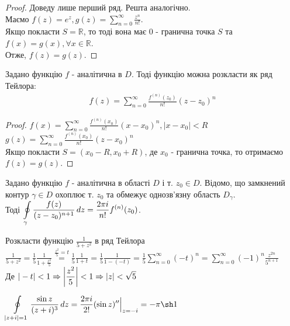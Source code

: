 \documentclass{math_library}
\begin{document}
\begin{proof}
Доведу лише перший ряд. Решта аналогічно.\\
Маємо $f(z) = e^z, g(z)=\displaystyle \sum_{n=0}^{\infty} \frac{z^n}{n!}$.\\
Якщо покласти $S=\mathbb{R}$, то тоді вона має $0$ - гранична точка $S$ та $f(x)=g(x), \forall x \in \mathbb{R}$.\\
	Отже, $f(z)=g(z)$.
\end{proof}

\begin{corollary}
Задано функцію $f$ - аналітична в $D$. Тоді функцію можна розкласти як ряд Тейлора:
\begin{align*}
	f(z) = \sum_{n=0}^{\infty} \frac{f^{(n)}(z_0)}{n!} (z-z_0)^n
\end{align*}
\end{corollary}

\begin{proof}
$f(x)=\displaystyle \sum_{n=0}^{\infty} \frac{f^{(n)}(x_0)}{n!} (x-x_0)^n, |x-x_0|<R$\\ $\displaystyle g(z)=\sum_{n=0}^{\infty} \frac{f^{(n)}(x_0)}{n!} (z-x_0)^n$\\
	Якщо покласти $S=(x_0-R, x_0+R)$, де $x_0$ - гранична точка, то отримаємо $f(z)=g(z)$. 
\end{proof}

\begin{corollary}
Задано функцію $f$ - аналітична в області $D$ і т. $z_0 \in D$. Відомо, що замкнений контур $\gamma \in D$ охоплює т. $z_0$ та обмежує однозв'язну область $D_{\gamma}$. \\
Тоді $\displaystyle\oint\displaylimits_{\gamma} \frac{f(z)}{(z-z_0)^{n+1}}\,dz = \frac{2 \pi i}{n!} f^{(n)}(z_0)$.
\end{corollary}

\begin{example}
Розкласти функцію $\displaystyle \frac{1}{5+z^2}$ в ряд Тейлора\\
	$\displaystyle \frac{1}{5+z^2} = \frac{1}{5} \frac{1}{1 + \frac{z^2}{5}} \overset{\textstyle \frac{z^2}{5} = t}{=} \frac{1}{5} \frac{1}{1+t} = \frac{1}{5} \frac{1}{1-(-t)} = \frac{1}{5} \sum_{n=0}^{\infty} (-t)^n = \sum_{n=0}^{\infty} (-1)^n \frac{z^{2n}}{5^{n+1}}$\\
	Де $\displaystyle |-t|<1 \Rightarrow \abs{\frac{z^2}{5}} < 1 \Rightarrow |z| < \sqrt{5}$
\end{example}

\begin{example}
$\displaystyle \oint\displaylimits_{|z+i|=1} \frac{\sin z}{(z+i)^3} \,dz = \frac{2\pi i}{2!} (\sin z)'' \Big|_{z=-i} = -\pi \sh 1$
\end{example}
\end{document}
